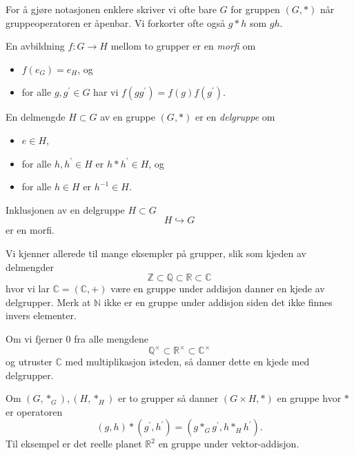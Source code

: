 For å gjøre notasjonen enklere skriver vi ofte bare $G$ for gruppen $(G,\ast)$
når gruppeoperatoren er åpenbar.
Vi forkorter ofte også $g\ast h$ som $gh$.

\begin{definition}
    En avbildning $f\colon G\to H$ mellom to grupper
    er en \textit{morfi} om
    \begin{itemize}
        \item $f(e_G) = e_H$, og
        \item for alle $g, g^\prime\in G$ har vi $f(gg^\prime) = f(g)f(g^\prime)$.
    \end{itemize}
\end{definition}

\begin{definition}
    En delmengde $H\subset G$ av en gruppe $(G, \ast)$ er en \textit{delgruppe}
    om
    \begin{itemize}
        \item $e\in H$,
        \item for alle $h, h^\prime \in H$ er $h\ast h^\prime\in H$,
            og
        \item for alle $h\in H$ er $h^{-1}\in H$.
    \end{itemize}
\end{definition}

\begin{remark}
    Inklusjonen av en delgruppe $H\subset G$
    \[
        H\hookrightarrow G
    \]
    er en morfi.
\end{remark}

\begin{example}
    Vi kjenner allerede til mange eksempler på grupper,
    slik som kjeden av delmengder
    \[
        \mathbb Z
        \subset \mathbb Q
        \subset \mathbb R
        \subset \mathbb C
    \]
    hvor vi lar $\mathbb C = (\mathbb C, +)$ være en gruppe under addisjon
    danner en kjede av delgrupper.
    Merk at $\mathbb N$ ikke er en gruppe under addisjon siden det ikke finnes
    invers elementer.

    Om vi fjerner $0$ fra alle mengdene
    \[
        \mathbb Q^\times
        \subset \mathbb R^\times
        \subset \mathbb C^\times
    \]
    og utruster $\mathbb C$ med multiplikasjon isteden,
    så danner dette en kjede med delgrupper.
\end{example}

\begin{example}
    Om $(G, \ast_G), (H, \ast_H)$ er to grupper så danner $(G\times H, \ast)$
    en gruppe hvor $\ast$ er operatoren
    \[
        (g, h)\ast (g^\prime, h^\prime)
        = (g \ast_G g^\prime, h\ast_H h^\prime).
    \]
    Til eksempel er det reelle planet $\mathbb R^2$ en gruppe under vektor-addisjon.
\end{example}

